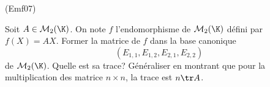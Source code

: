 \begin{tiny}(Emf07)\end{tiny}
Soit $A\in \mathcal{M}_{2}(\K)$. On note $f$ l'endomorphisme de $\mathcal{M}_{2}(\K)$ d{\'e}fini par $f(X)=AX$. Former la matrice de $f$ dans la base canonique 
\begin{displaymath}
 \left( E_{1,1},E_{1,2},E_{2,1},E_{2,2}\right) 
\end{displaymath}
de $\mathcal{M}_{2}(\K)$. Quelle est sa trace?\newline
Généraliser en montrant que pour la multiplication des matrice $n\times n$, la trace est $n\tr A$.
